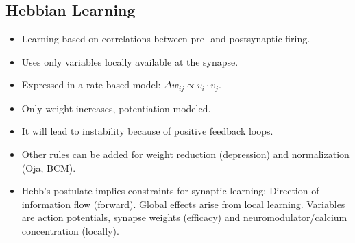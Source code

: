 \documentclass[a4paper, 12pt]{article}
\begin{document}
\subsection{Hebbian Learning}
\begin{itemize}[noitemsep,nolistsep]
	\item Learning based on correlations between pre- and postsynaptic firing.
	\item Uses only variables locally available at the synapse.
	\item Expressed in a rate-based model: $\Delta w_{ij}\propto v_i\cdot v_j$.
	\item Only weight increases, potentiation modeled.
	\item It will lead to instability because of positive feedback loops.
	\item Other rules can be added for weight reduction (depression) and normalization (Oja, BCM).
	\item Hebb's postulate implies constraints for synaptic learning:
	\subitem Direction of information flow (forward).
	\subitem Global effects arise from local learning.
	\subitem Variables are action potentials, synapse weights (efficacy) and neuromodulator/calcium concentration (locally).
\end{itemize}
\end{document}
